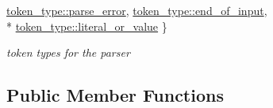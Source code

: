 \begin{DoxyCompactItemize}
\hyperlink{classnlohmann_1_1detail_1_1lexer_a3f313cdbe187cababfc5e06f0b69b098a456e19aeafa334241c7ff3f589547f9d}{token\+\_\+type\+::parse\+\_\+error}, 
\hyperlink{classnlohmann_1_1detail_1_1lexer_a3f313cdbe187cababfc5e06f0b69b098aca11f56dd477c09e06583dbdcda0985f}{token\+\_\+type\+::end\+\_\+of\+\_\+input}, 
\\*
\hyperlink{classnlohmann_1_1detail_1_1lexer_a3f313cdbe187cababfc5e06f0b69b098ad2a8e6f6721cccec0b466301dd9495a5}{token\+\_\+type\+::literal\+\_\+or\+\_\+value}
 \}\begin{DoxyCompactList}\small\item\em token types for the parser \end{DoxyCompactList}
\end{DoxyCompactItemize}
\subsection*{Public Member Functions}
